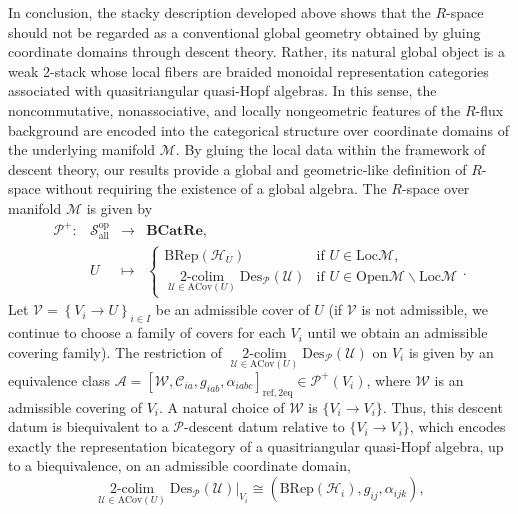 \documentclass[reqno]{amsart}
\theoremstyle{definition}
\theoremstyle{remark}
\begin{document}
In conclusion, the stacky description developed above shows that the $R$-space should not be regarded as a conventional global geometry obtained by gluing coordinate domains through descent theory. Rather, its natural global object is a weak 2-stack whose local fibers are braided monoidal representation categories associated with quasitriangular quasi-Hopf algebras. In this sense, the noncommutative, nonassociative, and locally nongeometric features of the $R$-flux background are encoded into the categorical structure over coordinate domains of the underlying manifold $\mathcal{M}$. By gluing the local data within the framework of descent theory, our results provide a global and geometric-like definition of $R$-space without requiring the existence of a global algebra. The $R$-space over manifold $\mathcal{M}$ is given by
\begin{equation}
        \begin{array}{rccl}
\mathscr{P}^+: & \mathscr{S}_{\text{all}}^{\text{op}}& \longrightarrow & \textbf{BCatRe}, \\
 & U & \longmapsto  & \left\{\begin{array}{cl}
      \text{BRep}(\mathscr{H}_U)&\text{if } U \in \text{Loc}\mathcal{M},  \\
      \mathop{2\text{-colim}}\limits_{\mathcal{U}\in\text{ACov}(U)}{\text{Des}_\mathscr{P}(\mathcal{U})}&\text{if } U \in \text{Open}\mathcal{M}\backslash\text{Loc}\mathcal{M}
 \end{array}\right..
\end{array}
\end{equation}
Let $\mathcal{V}=\left\{V_i\longrightarrow U\right\}_{i\in I}$ be an admissible cover of $U$ (if $\mathcal{V}$ is not admissible, we continue to choose a family of covers for each $V_i$ until we obtain an admissible covering family). The restriction of $\mathop{2\text{-colim}}\limits_{\mathcal{U}\in\text{ACov}(U)}{\text{Des}_\mathscr{P}(\mathcal{U})}$ on $V_i$ is given by an equivalence class $\mathcal{A}=\left[\mathcal{W}, \mathcal{C}_{ia},g_{iab},\alpha_{iabc} \right]_{\text{ref},2\text{eq}}\in \mathscr{P}^+(V_i)$, where $\mathcal{W}$ is an admissible covering of $V_i$. A natural choice of $\mathcal{W}$ is $\{V_i \longrightarrow V_i\}$. Thus, this descent datum is biequivalent to a $\mathscr{P}$-descent datum relative to $\{V_i \longrightarrow V_i\}$, which encodes exactly the representation bicategory of a quasitriangular quasi-Hopf algebra, up to a biequivalence, on an admissible coordinate domain,
\begin{equation}
    \mathop{2\text{-colim}}\limits_{\mathcal{U}\in\text{ACov}(U)}{\text{Des}_\mathscr{P}(\mathcal{U})}\Big|_{V_i} \cong \left(\text{BRep}(\mathscr{H}_i),g_{ij},\alpha_{ijk}\right),
\end{equation}
\end{document}
